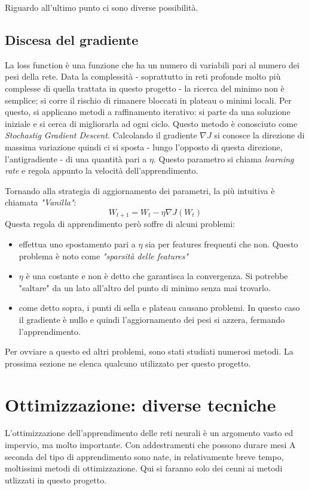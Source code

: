 Riguardo all'ultimo punto ci sono diverse possibilità. 
\subsection{Discesa del gradiente}
La loss function è una funzione che ha un numero di variabili pari al numero dei pesi della rete. Data la complessità - soprattutto in reti profonde molto più complesse di quella trattata in questo progetto - la ricerca del minimo non è semplice; si corre il rischio di rimanere bloccati in plateau o minimi locali. Per questo, si applicano metodi a raffinamento iterativo: si parte da una soluzione iniziale e si cerca di migliorarla ad ogni ciclo. Questo metodo è conosciuto come \emph{Stochastig Gradient Descent}\parencite{WSGD}.
Calcolando il gradiente $\nabla J$ si conosce la direzione di massima variazione quindi ci si sposta - lungo l'opposto di questa direzione, l'antigradiente - di una quantità pari a $\eta$. Questo parametro si chiama \emph{learning rate} e regola appunto la velocità dell'apprendimento. 

Tornando alla strategia di aggiornamento dei parametri, la più intuitiva è chiamata \emph{"Vanilla"}: 
\begin{equation}
W_{t+1} = W_{t} - \eta \nabla J(W_t)
\end{equation}
Questa regola di apprendimento però soffre di alcuni problemi: 
\begin{itemize}
\item effettua uno spostamento pari a $\eta$ sia per features frequenti che non. Questo problema è noto come \emph{"sparsità delle features"}
\item $\eta$ è una costante e non è detto che garantisca la convergenza. Si potrebbe "saltare" da un lato all'altro del punto di minimo senza mai trovarlo. 
\item come detto sopra, i punti di sella e plateau causano problemi. In questo caso il gradiente è nullo e quindi l'aggiornamento dei pesi si azzera, fermando l'apprendimento. 
\end{itemize}

Per ovviare a questo ed altri problemi, sono stati studiati numerosi metodi. La prossima sezione ne elenca qualcuno utilizzato per questo progetto. 

\section{Ottimizzazione: diverse tecniche}
L'ottimizzazione dell'apprendimento delle reti neurali è un argomento vasto ed impervio, ma molto importante. Con addestramenti che possono durare mesi A seconda del tipo di apprendimento sono nate, in relativamente breve tempo, moltissimi metodi di ottimizzazione. Qui si faranno solo dei cenni ai metodi utlizzati in questo progetto. 

